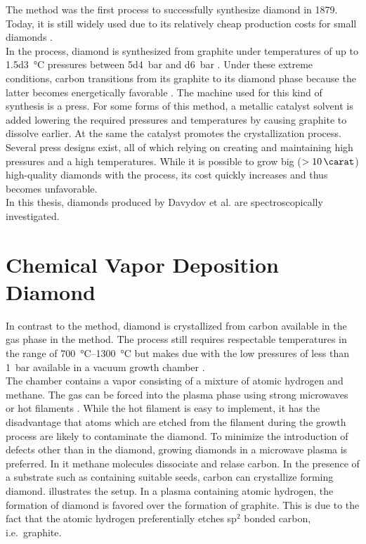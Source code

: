 	The \HPHT method was the first process to successfully synthesize diamond in 1879.
	Today, it is still widely used due to its relatively cheap production costs for small diamonds \cite{wikiSyntheticDiamond}.
	\\
	In the \HPHT process, diamond is synthesized from graphite under temperatures of up to \SI{1.5d3}{\celsius} pressures between \SI{5d4}{bar} and \SI{d6}{bar} \cite{davis1993diamond}. Under these extreme conditions, carbon transitions from its graphite to its diamond phase because the latter becomes energetically favorable \cite{liander1955artificial, bundy1955man, bovenkerk1993errors, bovenkerk1959preparation}.
	The machine used for this kind of synthesis is a press.
	For some forms of this method, a metallic catalyst solvent is added lowering the required pressures and temperatures by causing graphite to dissolve earlier. At the same the catalyst promotes the crystallization process.
	Several press designs exist, all of which relying on creating and maintaining high pressures and a high temperatures.
	While it is possible to grow big ($> \SI{10}{\carat}$) high-quality diamonds with the \HPHT process, its cost quickly increases and thus becomes unfavorable.
	\\
	In this thesis, \HPHT \nds diamonds produced by Davydov et al. \cite{Davydov2014} are spectroscopically investigated.

\section[CVD]{Chemical Vapor Deposition Diamond}\label{sec::cvd}

	In contrast to the \HPHT method, diamond is crystallized from carbon available in the gas phase in the \CVD method.
	The process still requires respectable temperatures in the range of \SIrange{700}{1300}{\celsius} but makes due with the low pressures of less than \SI{1}{\bar} available in a vacuum growth chamber \cite{schwander2011review}.
	\\
	The chamber contains a vapor consisting of a mixture of atomic hydrogen and methane. The gas can be forced into the plasma phase using strong microwaves or hot filaments \cite{balmer2009chemical, ferro2002synthesis, koizumi2008physics}. While the hot filament is easy to implement, it has the disadvantage that atoms which are etched from the filament during the growth process are likely to contaminate the diamond. To minimize the introduction of defects other than \sivs in the diamond, growing diamonds in a microwave plasma is preferred. In it methane molecules dissociate and relase carbon. In the presence of a substrate such as \ir containing suitable seeds, carbon can crystallize forming diamond.  illustrates the setup. In a plasma containing atomic hydrogen, the formation of diamond is favored over the formation of graphite. This is due to the fact that the atomic hydrogen preferentially etches sp$^2$ bonded carbon, i.e.\ graphite.


